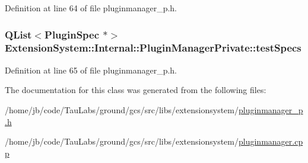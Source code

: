 \-Definition at line 64 of file pluginmanager\-\_\-p.\-h.

\hypertarget{class_extension_system_1_1_internal_1_1_plugin_manager_private_a25ce55fe8bc3538c6fe2c5ac18be1f66}{
\subsubsection[{test\-Specs}]{\setlength{\rightskip}{0pt plus 5cm}\-Q\-List$<${\bf \-Plugin\-Spec} $\ast$$>$ {\bf \-Extension\-System\-::\-Internal\-::\-Plugin\-Manager\-Private\-::test\-Specs}}}\label{class_extension_system_1_1_internal_1_1_plugin_manager_private_a25ce55fe8bc3538c6fe2c5ac18be1f66}


\-Definition at line 65 of file pluginmanager\-\_\-p.\-h.



\-The documentation for this class was generated from the following files\-:\begin{DoxyCompactItemize}
\item 
/home/jb/code/\-Tau\-Labs/ground/gcs/src/libs/extensionsystem/\hyperlink{pluginmanager__p_8h}{pluginmanager\-\_\-p.\-h}\item 
/home/jb/code/\-Tau\-Labs/ground/gcs/src/libs/extensionsystem/\hyperlink{pluginmanager_8cpp}{pluginmanager.\-cpp}\end{DoxyCompactItemize}
